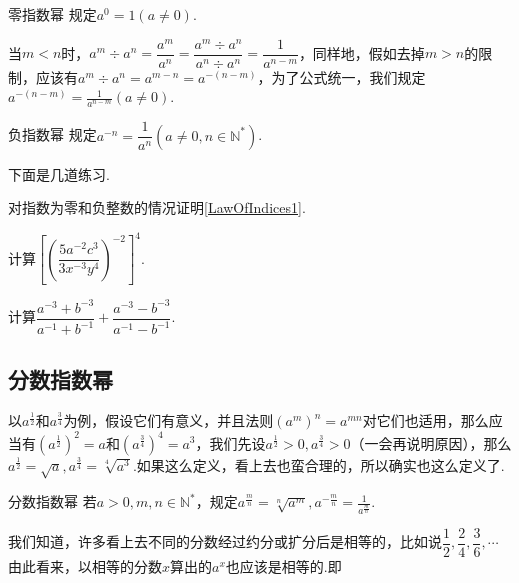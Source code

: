 \documentclass[lang=cn,math=cm,chinesefont=nofont,11pt,scheme=chinese,twocol]{elegantbook}
\begin{document}
\begin{definition}{零指数幂}
  规定$a^0=1(a\neq 0)$.
\end{definition}

当$m<n$时，$a^m\div a^n=\dfrac{a^m}{a^n}=\dfrac{a^m\div a^n}{a^n\div a^n}=\dfrac1{a^{n-m}}$，同样地，假如去掉$m>n$的限制，应该有$a^m\div a^n=a^{m-n}=a^{-(n-m)}$，为了公式统一，我们规定$a^{-(n-m)}=\frac1{a^{n-m}}(a\neq0)$.

\begin{definition}{负指数幂}
  规定$a^{-n}=\dfrac{1}{a^n}(a\neq 0,n\in\mathbb{N}^*)$.
\end{definition}

下面是几道练习.

\begin{exercise}
  对指数为零和负整数的情况证明\ref{LawOfIndices1}.
\end{exercise}

\begin{spacing}{1.8}
  \begin{exercise}\label{ZXSXSYJC_reformatted_3_P9.8b}
  计算$\left[\left(\dfrac{5a^{-2}c^3}{3x^{-3}y^4}\right)^{-2}\right]^4$.
  \end{exercise}

  \begin{exercise}\label{ZXSXSYJC_reformatted_3_P9.9b}
  计算$\dfrac{a^{-3}+b^{-3}}{a^{-1}+b^{-1}}+\dfrac{a^{-3}-b^{-3}}{a^{-1}-b^{-1}}$.
  \end{exercise}
\end{spacing}

\subsection{分数指数幂}

以$a^\frac{1}{2}$和$a^\frac34$为例，假设它们有意义，并且法则$(a^m)^n=a^{mn}$对它们也适用，那么应当有$(a^\frac{1}{2})^2=a$和$(a^\frac34)^4=a^3$，我们先设$a^\frac{1}{2}>0,a^\frac34>0$（一会再说明原因），那么$a^\frac{1}{2}=\sqrt{a},a^\frac34=\sqrt[4]{a^3}$.如果这么定义，看上去也蛮合理的，所以确实也这么定义了.

\begin{definition}{分数指数幂}
  若$a>0,m,n\in\mathbb{N}^*$，规定$a^\frac mn=\sqrt[n]{a^m},a^{-\frac mn}=\frac1{a^\frac mn}$.
\end{definition}

我们知道，许多看上去不同的分数经过约分或扩分后是相等的，比如说$\dfrac12,\dfrac24,\dfrac36,\cdots$由此看来，以相等的分数$x$算出的$a^x$也应该是相等的.即
\end{document}
